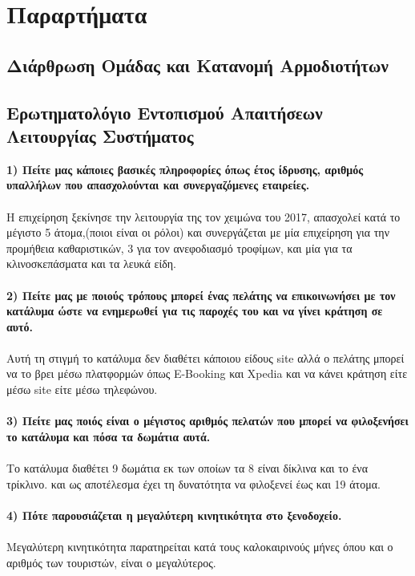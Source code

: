 \chapter{Παραρτήματα}
		
\section{Διάρθρωση Ομάδας και Κατανομή Αρμοδιοτήτων}
\section{Ερωτηματολόγιο Εντοπισμού Απαιτήσεων Λειτουργίας Συστήματος}
\textbf{1) Πείτε μας κάποιες βασικές πληροφορίες όπως έτος ίδρυσης, αριθμός 
	υπαλλήλων που απασχολούνται και συνεργαζόμενες εταιρείες.} \\ \\
\noindent
Η επιχείρηση ξεκίνησε την λειτουργία της τον χειμώνα του 2017, απασχολεί κατά 
το μέγιστο 5 άτομα,(ποιοι είναι οι ρόλοι) και συνεργάζεται με μία επιχείρηση
για την προμήθεια καθαριστικών, 3 για τον ανεφοδιασμό τροφίμων, και μία για 
τα κλινοσκεπάσματα και τα λευκά είδη. \\ \\

\noindent
\textbf{2) Πείτε μας με ποιούς τρόπους μπορεί ένας πελάτης να επικοινωνήσει
	με τον κατάλυμα ώστε να ενημερωθεί για τις παροχές του και να γίνει κράτηση
	σε αυτό.} \\ \\
\noindent
Αυτή τη στιγμή το κατάλυμα δεν διαθέτει κάποιου είδους site αλλά ο πελάτης
μπορεί να το βρει μέσω πλατφορμών όπως 	E-Booking και Xpedia και να κάνει
κράτηση είτε μέσω site είτε μέσω τηλεφώνου. \\ \\ 
  
\noindent
\textbf{3) Πείτε μας ποιός είναι ο μέγιστος αριθμός πελατών που μπορεί να φιλοξενήσει 
	το κατάλυμα και πόσα τα δωμάτια αυτά.} \\ \\
\noindent
Το κατάλυμα διαθέτει 9 δωμάτια εκ των οποίων τα 8 είναι δίκλινα και το ένα τρίκλινο.
και ως αποτέλεσμα έχει τη δυνατότητα να φιλοξενεί έως και 19 άτομα.\\ \\

\noindent
\textbf{4) Πότε παρουσιάζεται η μεγαλύτερη κινητικότητα στο ξενοδοχείο.} \\ \\
\noindent
Μεγαλύτερη κινητικότητα παρατηρείται κατά τους καλοκαιρινούς μήνες όπου 
και ο αριθμός των τουριστών, είναι ο μεγαλύτερος.\\ \\

